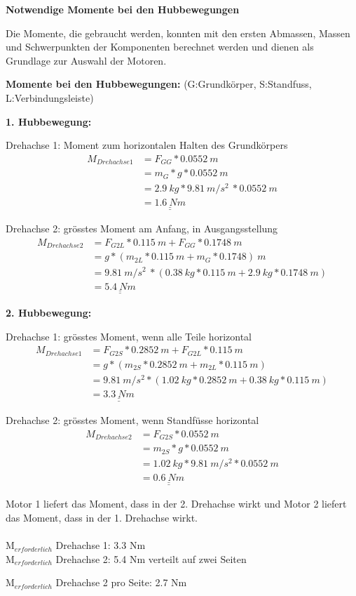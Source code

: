 \newpage

\textbf{Notwendige Momente bei den Hubbewegungen}

Die Momente, die gebraucht werden, konnten mit den ersten Abmassen, Massen und Schwerpunkten der Komponenten berechnet werden und dienen als Grundlage zur Auswahl der Motoren.

\textbf{Momente bei den Hubbewegungen:} (G:Grundkörper, S:Standfuss, L:Verbindungsleiste)

\textbf{1. Hubbewegung:}

Drehachse 1: Moment zum horizontalen Halten des Grundkörpers
\begin{align*}
    M_{Drehachse 1} &= F_{GG} * 0.0552\ m \\
    &= m_{G} * g * 0.0552\ m \\
    &= 2.9\ kg * 9.81\ m/s^2\ * 0.0552\ m \\
    &= \underline{\underline{1.6\ Nm}}
\end{align*}

Drehachse 2: grösstes Moment am Anfang, in Ausgangsstellung
\begin{align*}
    M_{Drehachse 2} &= F_{G2L} * 0.115\ m + F_{GG} * 0.1748\ m \\
    &= g * (m_{2L} * 0.115\ m + m_{G} * 0.1748)\ m \\
    &= 9.81\ m/s^2\ * (0.38\ kg * 0.115\ m + 2.9\ kg * 0.1748\ m) \\
    &= \underline{\underline{5.4\ Nm}}
\end{align*}

\textbf{2. Hubbewegung:}

Drehachse 1: grösstes Moment, wenn alle Teile horizontal
\begin{align*}
    M_{Drehachse 1} &= F_{G2S} * 0.2852\ m + F_{G2L} * 0.115\ m \\
    &= g * (m_{2S} * 0.2852\ m + m_{2L} * 0.115\ m) \\
    &= 9.81\ m/s^2 * (1.02\ kg * 0.2852\ m + 0.38\ kg * 0.115\ m) \\
    &= \underline{\underline{3.3\ Nm}}
\end{align*}

Drehachse 2: grösstes Moment, wenn Standfüsse horizontal
\begin{align*}
    M_{Drehachse 2} &= F_{G2S} * 0.0552\ m \\
    &= m_{2S} * g * 0.0552\ m \\
    &= 1.02\ kg * 9.81\ m/s^2 * 0.0552\ m \\
    &=\underline{\underline{0.6\ Nm}}
\end{align*}

Motor 1 liefert das Moment, dass in der 2. Drehachse wirkt und Motor 2 liefert das Moment, dass in der 1. Drehachse wirkt.\\
\\
M$_{erforderlich}$ Drehachse 1: 3.3 Nm\\

M$_{erforderlich}$ Drehachse 2: 5.4 Nm verteilt auf zwei Seiten

M$_{erforderlich}$ Drehachse 2 pro Seite: 2.7 Nm

